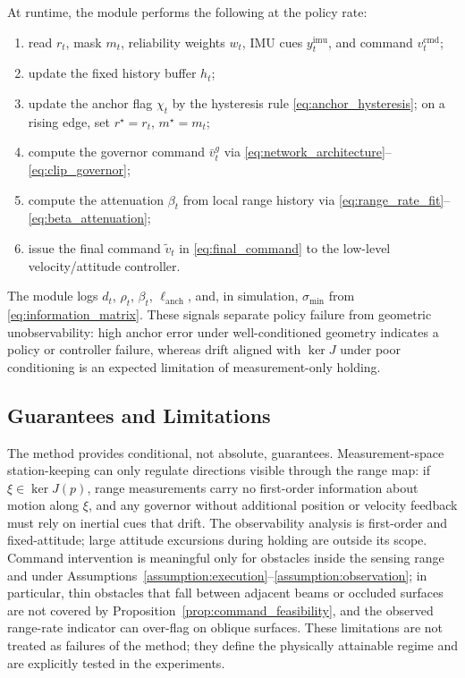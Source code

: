 \documentclass[11pt]{article}
\begin{document}
At runtime, the module performs the following at the policy rate:
\begin{enumerate}
    \item read $r_t$, mask $m_t$, reliability weights $w_t$, IMU cues
    $y^{\mathrm{imu}}_t$, and command $v^{\mathrm{cmd}}_t$;
    \item update the fixed history buffer $h_t$;
    \item update the anchor flag $\chi_t$ by the hysteresis rule
    \eqref{eq:anchor_hysteresis}; on a rising edge, set $r^\star=r_t$,
    $m^\star=m_t$;
    \item compute the governor command $\bar v^g_t$ via
    \eqref{eq:network_architecture}--\eqref{eq:clip_governor};
    \item compute the attenuation $\beta_t$ from local range history via
    \eqref{eq:range_rate_fit}--\eqref{eq:beta_attenuation};
    \item issue the final command $\tilde v_t$ in \eqref{eq:final_command} to
    the low-level velocity/attitude controller.
\end{enumerate}
The module logs $d_t$, $\rho_t$, $\beta_t$, $\ell_{\mathrm{anch}}$, and, in
simulation, $\sigma_{\min}$ from \eqref{eq:information_matrix}. These signals
separate policy failure from geometric unobservability: high anchor error under
well-conditioned geometry indicates a policy or controller failure, whereas
drift aligned with $\ker J$ under poor conditioning is an expected limitation of
measurement-only holding.

\subsection{Guarantees and Limitations}
\label{sec:guarantees}

The method provides conditional, not absolute, guarantees.
Measurement-space station-keeping can only regulate directions visible through
the range map: if $\xi\in\ker J(p)$, range measurements carry no first-order
information about motion along $\xi$, and any governor without additional
position or velocity feedback must rely on inertial cues that drift. The
observability analysis is first-order and fixed-attitude; large attitude
excursions during holding are outside its scope. Command intervention is
meaningful only for obstacles inside the sensing range and under
Assumptions~\ref{assumption:execution}--\ref{assumption:observation}; in
particular, thin obstacles that fall between adjacent beams or occluded surfaces
are not covered by Proposition~\ref{prop:command_feasibility}, and the observed
range-rate indicator can over-flag on oblique surfaces. These limitations are
not treated as failures of the method; they define the physically attainable
regime and are explicitly tested in the experiments.
\end{document}
